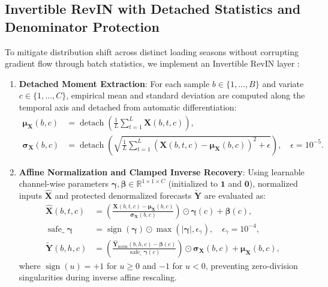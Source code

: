 \documentclass[pdflatex,sn-mathphys-num,referee,lineno]{sn-jnl}
\theoremstyle{thmstyleone}
\theoremstyle{thmstyletwo}
\theoremstyle{thmstylethree}
\begin{document}
\subsection{Invertible RevIN with Detached Statistics and Denominator Protection}\label{subsec:revin}
To mitigate distribution shift across distinct loading seasons without corrupting gradient flow through batch statistics, we implement an Invertible RevIN layer \cite{kim2022revin}:
\begin{enumerate}
    \item \textbf{Detached Moment Extraction}: For each sample $b \in \{1, \dots, B\}$ and variate $c \in \{1, \dots, C\}$, empirical mean and standard deviation are computed along the temporal axis and detached from automatic differentiation:
    \begin{align}
    \boldsymbol{\mu}_{\mathbf{X}}(b, c) &= \operatorname{detach}\!\left(\frac{1}{L} \sum_{t=1}^L \mathbf{X}(b, t, c)\right), \label{eq:revin_mean} \\
    \boldsymbol{\sigma}_{\mathbf{X}}(b, c) &= \operatorname{detach}\!\left(\sqrt{\frac{1}{L} \sum_{t=1}^L \left( \mathbf{X}(b, t, c) - \boldsymbol{\mu}_{\mathbf{X}}(b, c) \right)^2 + \epsilon}\right), \quad \epsilon = 10^{-5}. \label{eq:revin_std}
    \end{align}
    \item \textbf{Affine Normalization and Clamped Inverse Recovery}: Using learnable channel-wise parameters $\boldsymbol{\gamma}, \boldsymbol{\beta} \in \mathbb{R}^{1 \times 1 \times C}$ (initialized to $\mathbf{1}$ and $\mathbf{0}$), normalized inputs $\hat{\mathbf{X}}$ and protected denormalized forecasts $\tilde{\mathbf{Y}}$ are evaluated as:
    \begin{align}
    \hat{\mathbf{X}}(b, t, c) &= \left( \frac{\mathbf{X}(b, t, c) - \boldsymbol{\mu}_{\mathbf{X}}(b, c)}{\boldsymbol{\sigma}_{\mathbf{X}}(b, c)} \right) \odot \boldsymbol{\gamma}(c) + \boldsymbol{\beta}(c), \label{eq:revin_norm} \\
    \operatorname{safe\_}\boldsymbol{\gamma} &= \operatorname{sign}(\boldsymbol{\gamma}) \odot \max(|\boldsymbol{\gamma}|, \epsilon_{\gamma}), \quad \epsilon_{\gamma} = 10^{-4}, \label{eq:safe_gamma} \\
    \tilde{\mathbf{Y}}(b, h, c) &= \left( \frac{\hat{\mathbf{Y}}_{\mathrm{norm}}(b, h, c) - \boldsymbol{\beta}(c)}{\operatorname{safe\_}\boldsymbol{\gamma}(c)} \right) \odot \boldsymbol{\sigma}_{\mathbf{X}}(b, c) + \boldsymbol{\mu}_{\mathbf{X}}(b, c), \label{eq:final_denorm}
    \end{align}
    where $\operatorname{sign}(u) = +1$ for $u \ge 0$ and $-1$ for $u < 0$, preventing zero-division singularities during inverse affine rescaling.
\end{enumerate}
\end{document}
